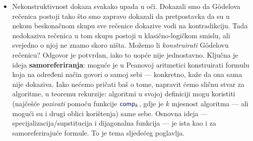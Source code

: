 \begin{itemize}
    \item Nekonstruktivnost dokaza svakako upada u oči. Dokazali smo da Gödelova rečenica postoji tako što smo zapravo dokazali da pretpostavka da su u nekom beskonačnom skupu sve rečenice dokazive vodi na kontradikciju. Tada nedokaziva rečenica u tom skupu postoji u klasično-logičkom smislu, ali svejedno o njoj ne znamo skoro ništa. Možemo li \emph{konstruirati} Gödelovu rečenicu? Odgovor je potvrdan, iako to uopće nije jednostavno. Ključna je ideja \textbf{samoreferiranja}: moguće je u Peanovoj aritmetici konstruirati formulu koja na određeni način govori o samoj sebi --- konkretno, kaže da ona sama nije dokaziva. Iako nećemo pričati baš o tome, napravit ćemo sličnu stvar za algoritme, u teoremu rekurzije: algoritmi u svojoj definiciji mogu koristiti (najčešće \emph{pozivati} pomoću funkcije $\f{comp}_k$, gdje je $k$ mjesnost algoritma --- ali mogući su i drugi oblici korištenja) same sebe. Osnovna ideja --- specijalizacija\slash supstitucija i dijagonalna funkcija --- je ista kao i za samoreferirajuće formule. To je tema sljedećeg poglavlja.
\end{itemize}
